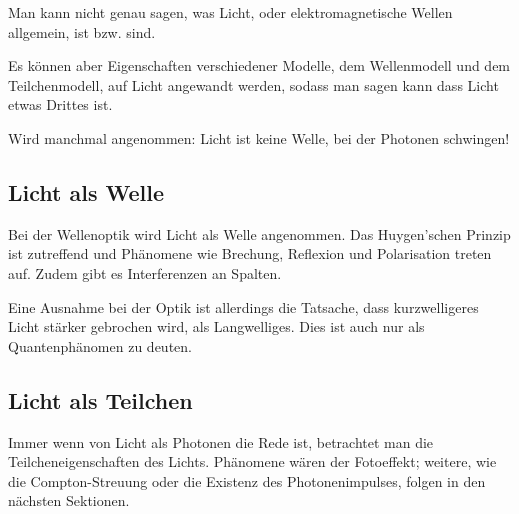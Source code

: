 Man kann nicht genau sagen, was Licht, oder elektromagnetische Wellen allgemein, ist bzw. sind.

Es können aber Eigenschaften verschiedener Modelle, dem Wellenmodell und dem Teilchenmodell, auf Licht angewandt werden, sodass man sagen kann dass Licht etwas \glqq Drittes\grqq{} ist.

\begin{Wichtig}
	Wird manchmal angenommen: Licht ist keine Welle, bei der Photonen schwingen!
\end{Wichtig}

\subsection{Licht als Welle}

Bei der Wellenoptik wird Licht als Welle angenommen. Das Huygen'schen Prinzip ist zutreffend und Phänomene wie Brechung, Reflexion und Polarisation treten auf. Zudem gibt es Interferenzen an Spalten.

Eine Ausnahme bei der Optik ist allerdings die Tatsache, dass kurzwelligeres Licht stärker gebrochen wird, als Langwelliges. Dies ist auch nur als Quantenphänomen zu deuten.


\subsection{Licht als Teilchen}

Immer wenn von Licht als Photonen die Rede ist, betrachtet man die Teilcheneigenschaften des Lichts. Phänomene wären der Fotoeffekt; weitere, wie die Compton-Streuung oder die Existenz des Photonenimpulses, folgen in den nächsten Sektionen.